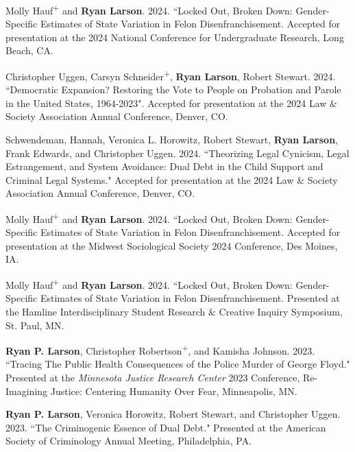 \documentclass[letterpaper]{article}
\renewenvironment{itemize}{
  \begin{list}{}{
    \setlength{\leftmargin}{1.5em}
  }
}{
  \end{list}
}
\begin{document}
\begin{itemize}
\item Molly Hauf\textsuperscript{+} and \textbf{Ryan Larson}. 2024. ``Locked Out, Broken Down: Gender-Specific Estimates of State Variation in Felon Disenfranchisement. Accepted for presentation at the 2024 National Conference for Undergraduate Research, Long Beach, CA. 

\item Christopher Uggen, Carsyn Schneider\textsuperscript{+}, \textbf{Ryan Larson}, Robert Stewart. 2024. ``Democratic Expansion? Restoring the Vote to People on Probation and Parole in the United States, 1964-2023". Accepted for presentation at the 2024 Law \& Society Association Annual Conference, Denver, CO. 

\item Schwendeman, Hannah, Veronica L. Horowitz, Robert Stewart, \textbf{Ryan Larson}, Frank Edwards, and Christopher Uggen. 2024.  ``Theorizing Legal Cynicism, Legal Estrangement, and System Avoidance: Dual Debt in the Child Support and Criminal Legal Systems." Accepted for presentation at the 2024 Law \& Society Association Annual Conference, Denver, CO. 

\item Molly Hauf\textsuperscript{+} and \textbf{Ryan Larson}. 2024. ``Locked Out, Broken Down: Gender-Specific Estimates of State Variation in Felon Disenfranchisement. Accepted for presentation at the Midwest Sociological Society 2024 Conference, Des Moines, IA. 

\item Molly Hauf\textsuperscript{+} and \textbf{Ryan Larson}. 2024. ``Locked Out, Broken Down: Gender-Specific Estimates of State Variation in Felon Disenfranchisement. Presented at the Hamline Interdisciplinary Student Research \& Creative Inquiry Symposium, St. Paul, MN. 

\item \textbf{Ryan P. Larson}, Christopher Robertson\textsuperscript{+}, and Kamisha Johnson. 2023. ``Tracing The Public Health Consequences of the Police Murder of George Floyd." Presented at the \textit{Minnesota Justice Research Center} 2023 Conference, Re-Imagining Justice: Centering Humanity Over Fear, Minneapolis, MN.   

\item \textbf{Ryan P. Larson}, Veronica Horowitz, Robert Stewart, and Christopher Uggen. 2023. ``The Criminogenic Essence of Dual Debt." Presented at the American Society of Criminology Annual Meeting, Philadelphia, PA. 


\end{itemize}
\end{document}
